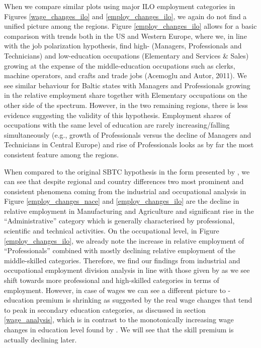 \documentclass[11pt]{article}
\begin{document}
When we compare similar plots using major ILO employment categories in Figures \ref{wage_changes_ilo} and \ref{employ_changes_ilo}, we again do not find a unified picture among the regions. Figure \ref{employ_changes_ilo} allows for a basic comparison with trends both in the US and Western Europe, where we, in line with the job polarization hypothesis, find high- (Managers, Professionals and Technicians) and low-education occupations (Elementary and Services \& Sales) growing at the expense of the middle-education occupations such as clerks, machine operators, and crafts and trade jobs (Acemoglu and Autor, 2011). We see similar behaviour for Baltic states with Managers and Professionals growing in the relative employment share together with Elementary occupations on the other side of the spectrum. However, in the two remaining regions, there is less evidence suggesting the validity of this hypothesis. Employment shares of occupations with the same level of education are rarely increasing/falling simultaneously (e.g., growth of Professionals versus the decline of Managers and Technicians in Central Europe) and  rise of Professionals looks as by far the most consistent feature among the regions.



When compared to the original SBTC hypothesis in the form presented by \citet{katz1992changes}, we can see that despite regional and country differences two most prominent and consistent phenomena coming from the industrial and occupational analysis in Figure \ref{employ_changes_nace} and \ref{employ_changes_ilo} are the decline in relative employment in Manufacturing and Agriculture and significant rise in the “Administrative” category which is generally characterised by professional, scientific and technical activities.  On the occupational level, in Figure \ref{employ_changes_ilo}, we already note the increase in relative employment of “Professionals” combined with mostly declining relative employment of the middle-skilled categories. Therefore, we find our findings from industrial and occupational employment division analysis in line with those given by \citet{katz1992changes} as we see shift towards more professional and high-skilled categories in terms of employment. 
However, in case of wages we can see a different picture to \citeauthor{katz1992changes} - education premium is shrinking as suggested by the real wage changes that tend to peak in secondary education categories, as discussed in section \ref{wage_analysis},  which is in contrast to the monotonically increasing wage changes in education level found by \citeauthor{katz1992changes}. We will see that the skill premium is actually declining later. 
\end{document}
